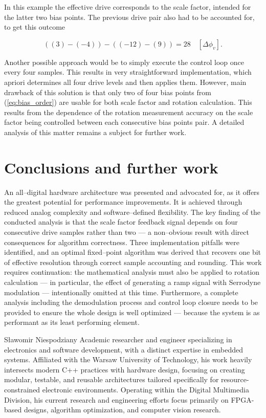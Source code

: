 \documentclass[journal,twoside,web]{ieeecolor}
\begin{document}
In this example the effective drive corresponds to the scale factor, intended for the latter two bias points. The previous drive pair also had to be accounted for, to get this outcome

\begin{equation}
    ((3) - (-4)) - ((-12) - (9)) = 28 \quad [\Delta\phi_{v}] \text{.}
\end{equation}

Another possible approach would be to simply execute the control loop once every four samples. This results in very straightforward implementation, which apriori determines all four drive levels and then applies them. However, main drawback of this solution is that only two of four bias points from (\ref{eq:bias_order}) are usable for both scale factor and rotation calculation. This results from the dependence of the rotation measurement accuracy on the scale factor being controlled between each consecutive bias points pair. A detailed analysis of this matter remains a subject for further work. 

\section{Conclusions and further work}
An all--digital hardware architecture was presented and advocated for, as it offers the greatest potential for performance improvements. It is achieved through reduced analog complexity and software--defined flexibility. The key finding of the conducted analysis is that the scale factor feedback signal depends on four consecutive drive samples rather than two — a non--obvious result with direct consequences for algorithm correctness. Three implementation pitfalls were identified, and an optimal fixed--point algorithm was derived that recovers one bit of effective resolution through correct sample accounting and rounding. This work requires continuation: the mathematical analysis must also be applied to rotation calculation — in particular, the effect of generating a ramp signal with Serrodyne modulation — intentionally omitted at this time. Furthermore, a complete analysis including the demodulation process and control loop closure needs to be provided to ensure the whole design is well optimized — because the system is as performant as its least performing element.




\begin{IEEEbiographynophoto}{Sławomir Niespodziany}
    Academic researcher and engineer specializing in electronics and software development, with a distinct expertise in embedded systems. Affiliated with the Warsaw University of Technology, his work heavily intersects modern C++ practices with hardware design, focusing on creating modular, testable, and reusable architectures tailored specifically for resource-constrained electronic environments. Operating within the Digital Multimedia Division, his current research and engineering efforts focus primarily on FPGA-based designs, algorithm optimization, and computer vision research.
\end{IEEEbiographynophoto}
\end{document}

